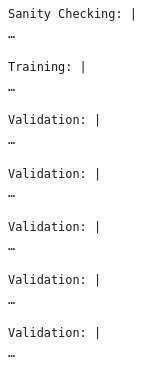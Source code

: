 \documentclass[11pt]{article}
\begin{document}
    
    \begin{Verbatim}[commandchars=\\\{\}]
Sanity Checking: |                                                                                            …
    \end{Verbatim}

    
    
    \begin{Verbatim}[commandchars=\\\{\}]
Training: |                                                                                                   …
    \end{Verbatim}

    
    
    \begin{Verbatim}[commandchars=\\\{\}]
Validation: |                                                                                                 …
    \end{Verbatim}

    
    
    \begin{Verbatim}[commandchars=\\\{\}]
Validation: |                                                                                                 …
    \end{Verbatim}

    
    
    \begin{Verbatim}[commandchars=\\\{\}]
Validation: |                                                                                                 …
    \end{Verbatim}

    
    
    \begin{Verbatim}[commandchars=\\\{\}]
Validation: |                                                                                                 …
    \end{Verbatim}

    
    
    \begin{Verbatim}[commandchars=\\\{\}]
Validation: |                                                                                                 …
    \end{Verbatim}
\end{document}
